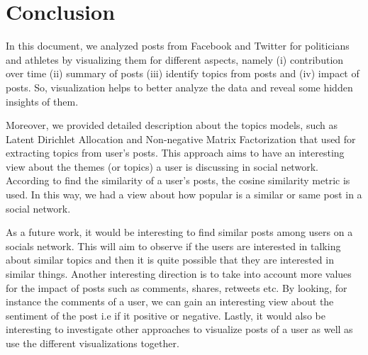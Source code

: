 \section{Conclusion}

In this document, we analyzed posts from Facebook and Twitter for politicians and athletes by visualizing them for different aspects, namely (i) contribution over time (ii) summary of posts (iii) identify topics from posts and (iv) impact of posts. So, visualization helps to better analyze the data and reveal some hidden insights of them. 


Moreover, we provided detailed description about the topics models, such as Latent Dirichlet Allocation and Non-negative Matrix Factorization that used for extracting topics from user's posts. This approach aims to have an interesting view about the themes (or topics) a user is discussing in social network. According to find the similarity of a user's posts, the cosine similarity metric is used. In this way, 
we had a view about how popular is a similar or same post in a social network. 


As a future work, it would be interesting to find similar posts among users on a socials network. This will aim to observe if the users are interested in talking about similar topics and then it is quite possible that they are interested in similar things. Another interesting direction is to take into account more values for the impact of posts such as comments, shares, retweets etc. By looking, for instance the comments of a user, we can gain an interesting view about the sentiment of the post i.e if it positive or negative. Lastly, it would also be interesting to investigate other approaches to visualize posts of a user as well as use the different visualizations together.

